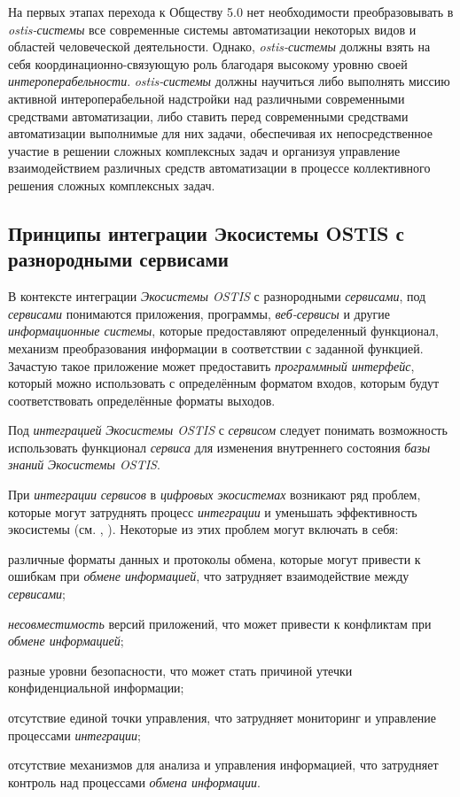 На первых этапах перехода к Обществу 5.0 нет необходимости преобразовывать в \textit{ostis-системы} все современные системы автоматизации некоторых видов и областей человеческой деятельности. 
Однако, \textit{ostis-системы} должны взять на себя координационно-связующую роль благодаря высокому уровню своей \textit{интероперабельности}. 
\textit{ostis-системы} должны научиться либо выполнять миссию активной интероперабельной надстройки над различными современными средствами автоматизации, либо ставить перед современными средствами автоматизации выполнимые для них задачи, обеспечивая их непосредственное участие в решении сложных комплексных задач и организуя управление взаимодействием различных средств автоматизации в процессе коллективного решения сложных комплексных задач.

\subsection{Принципы интеграции Экосистемы OSTIS с разнородными сервисами}
{\label{sec_integration_services}} 

В контексте интеграции \textit{Экосистемы OSTIS} с разнородными \textit{сервисами}, под \textit{сервисами} понимаются приложения, программы, \textit{веб-сервисы} и другие \textit{информационные системы}, которые предоставляют определенный функционал, механизм преобразования информации в соответствии с заданной функцией. Зачастую такое приложение может предоставить \textit{программный интерфейс}, который можно использовать с определённым форматом входов, которым будут соответствовать определённые форматы выходов.

Под \textit{интеграцией} \textit{Экосистемы OSTIS} с \textit{сервисом} следует понимать возможность использовать функционал \textit{сервиса} для изменения внутреннего состояния \textit{базы знаний} \textit{Экосистемы OSTIS}. 

При \textit{интеграции} \textit{сервисов} в \textit{цифровых экосистемах} возникают ряд проблем, которые могут затруднять процесс \textit{интеграции} и уменьшать эффективность экосистемы (см. , ). Некоторые из этих проблем могут включать в себя:

\begin{textitemize}
    \item различные форматы данных и протоколы обмена, которые могут привести к ошибкам при \textit{обмене информацией}, что затрудняет взаимодействие между \textit{сервисами};
    \item \textit{несовместимость} версий приложений, что может привести к конфликтам при \textit{обмене информацией};
    \item разные уровни безопасности, что может стать причиной утечки конфиденциальной информации;
    \item отсутствие единой точки управления, что затрудняет мониторинг и управление процессами \textit{интеграции};
    \item отсутствие механизмов для анализа и управления информацией, что затрудняет контроль над процессами \textit{обмена информации}.
\end{textitemize}

